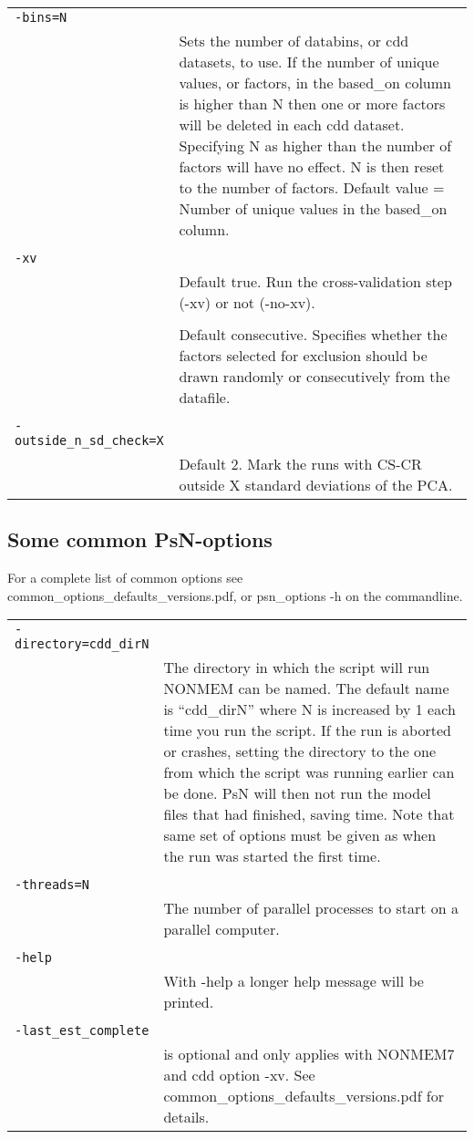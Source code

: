 \documentclass[a4paper,12pt]{article}
\begin{document}
\begin{longtable}{p{1in}p{4in}}
\verb|-bins=N| & \\
\nopagebreak
 & Sets the number of databins, or cdd datasets, to use. If the number of unique values, or factors, in the based\_on column is higher than N then one or more factors will be deleted in each cdd dataset. Specifying N as higher than the number of factors will have no effect. N is then reset to the number of factors. Default value = Number of unique values in the based\_on column. \\
\\
\verb|-xv| & \\
\nopagebreak
 & Default true. Run the cross-validation step (-xv) or not (-no-xv). \\
\\
\verb%-selection_method=<random | consecutive>% & \\
\nopagebreak
 & Default consecutive. Specifies whether the factors selected for exclusion should be drawn randomly or consecutively from the datafile. \\
\\
\verb|-outside_n_sd_check=X| & \\
\nopagebreak
 & Default 2. Mark the runs with CS-CR outside X standard deviations of the PCA. \\
\end{longtable}

\subsection{Some common PsN-options}

For a complete list of common options see common\_options\_defaults\_versions.pdf, or psn\_options -h on the commandline.

\begin{longtable}{p{1in}p{4in}}
\verb|-directory=cdd_dirN| & \\
\nopagebreak
 & The directory in which the script will run NONMEM can be named. The default name is “cdd\_dirN” where N is increased by 1 each time you run the script. If the run is aborted or crashes, setting the directory to the one from which the script was running earlier can be done. PsN will then not run the model files that had finished, saving time. Note that same set of options must be given as when the run was started the first time. \\
\\
\verb|-threads=N| & \\
\nopagebreak
 & The number of parallel processes to start on a parallel computer. \\
\\
\verb|-help| & \\
\nopagebreak
 & With -help a longer help message will be printed. \\
\\
\verb|-last_est_complete| & \\
\nopagebreak
 & is optional and only applies with NONMEM7 and cdd option -xv. See common\_options\_defaults\_versions.pdf for details.
\end{longtable}
\end{document}
